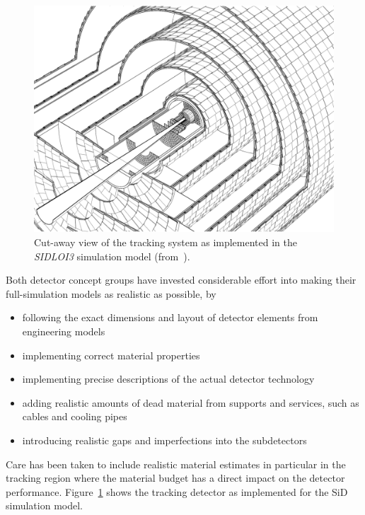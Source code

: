\begin{figure}
\begin{center}
\includegraphics[width=0.80\hsize]{chapters/figures/SiD_tracker_simmodel.png}
\end{center}
\caption{Cut-away view of the tracking system as implemented in the \emph{SIDLOI3} simulation model (from~\cite{Behnke:2013lya}).}
\label{fig:sid_trk}
\end{figure}
Both detector concept groups have invested considerable effort into making their full-simulation models as realistic as possible, by
\begin{itemize}
\item following the exact dimensions and layout of detector elements from engineering models
\item implementing correct material properties
\item implementing precise descriptions of the actual detector technology
\item adding realistic amounts of dead material from supports and services, such as cables and cooling pipes
\item introducing realistic gaps and imperfections into the subdetectors
\end{itemize}
Care has been taken to include realistic material estimates in particular in the tracking region where
the material budget has a direct impact on the detector performance.
Figure~\ref{fig:sid_trk} shows the tracking detector as implemented for the SiD simulation model.
